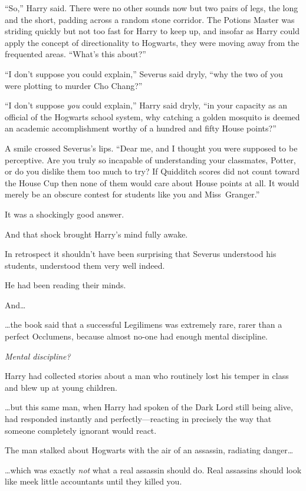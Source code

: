 \later

“So,” Harry said. There were no other sounds now but two pairs of legs, the long and the short, padding across a random stone corridor. The Potions Master was striding quickly but not too fast for Harry to keep up, and insofar as Harry could apply the concept of directionality to Hogwarts, they were moving away from the frequented areas. “What’s this about?”

“I don’t suppose you could explain,” Severus said dryly, “why the two of you were plotting to murder Cho Chang?”

“I don’t suppose \emph{you} could explain,” Harry said dryly, “in your capacity as an official of the Hogwarts school system, why catching a golden mosquito is deemed an academic accomplishment worthy of a hundred and fifty House points?”

A smile crossed Severus’s lips. “Dear me, and I thought you were supposed to be perceptive. Are you truly so incapable of understanding your classmates, Potter, or do you dislike them too much to try? If Quidditch scores did not count toward the House Cup then none of them would care about House points at all. It would merely be an obscure contest for students like you and Miss~Granger.”

It was a shockingly good answer.

And that shock brought Harry’s mind fully awake.

In retrospect it shouldn’t have been surprising that Severus understood his students, understood them very well indeed.

He had been reading their minds.

And…

…the book said that a successful Legilimens was extremely rare, rarer than a perfect Occlumens, because almost no-one had enough mental discipline.

\emph{Mental discipline?}

Harry had collected stories about a man who routinely lost his temper in class and blew up at young children.

…but this same man, when Harry had spoken of the Dark Lord still being alive, had responded instantly and perfectly—reacting in precisely the way that someone completely ignorant would react.

The man stalked about Hogwarts with the air of an assassin, radiating danger…

…which was exactly \emph{not} what a real assassin should do. Real assassins should look like meek little accountants until they killed you.

